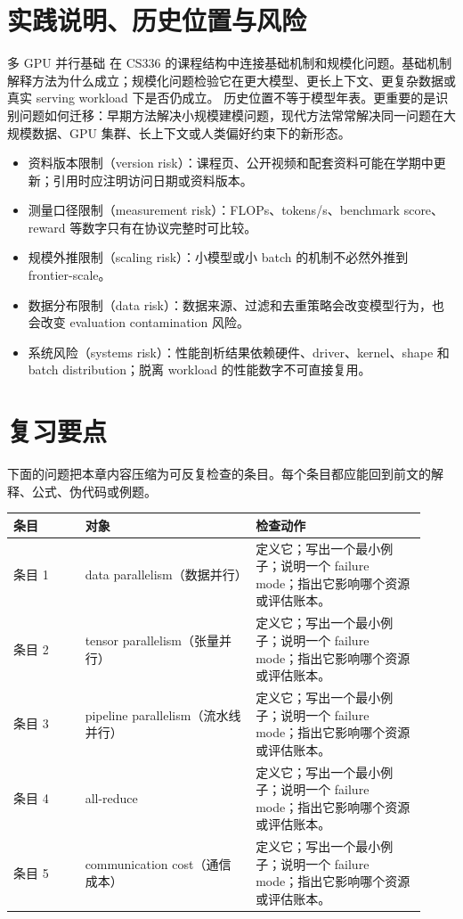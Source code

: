 \documentclass[a4paper]{article}
\begin{document}
\section{实践说明、历史位置与风险}
多 GPU 并行基础 在 CS336 的课程结构中连接基础机制和规模化问题。基础机制解释方法为什么成立；规模化问题检验它在更大模型、更长上下文、更复杂数据或真实 serving workload 下是否仍成立。
历史位置不等于模型年表。更重要的是识别问题如何迁移：早期方法解决小规模建模问题，现代方法常常解决同一问题在大规模数据、GPU 集群、长上下文或人类偏好约束下的新形态。
\begin{itemize}
\item 资料版本限制（version risk）：课程页、公开视频和配套资料可能在学期中更新；引用时应注明访问日期或资料版本。
\item 测量口径限制（measurement risk）：FLOPs、tokens/s、benchmark score、reward 等数字只有在协议完整时可比较。
\item 规模外推限制（scaling risk）：小模型或小 batch 的机制不必然外推到 frontier-scale。
\item 数据分布限制（data risk）：数据来源、过滤和去重策略会改变模型行为，也会改变 evaluation contamination 风险。
\item 系统风险（systems risk）：性能剖析结果依赖硬件、driver、kernel、shape 和 batch distribution；脱离 workload 的性能数字不可直接复用。
\end{itemize}
\section{复习要点}
下面的问题把本章内容压缩为可反复检查的条目。每个条目都应能回到前文的解释、公式、伪代码或例题。
\begin{longtable}{p{0.16\linewidth}p{0.38\linewidth}p{0.38\linewidth}}
\toprule
\textbf{条目} & \textbf{对象} & \textbf{检查动作}\\
\midrule
条目 1 & data parallelism（数据并行） & 定义它；写出一个最小例子；说明一个 failure mode；指出它影响哪个资源或评估账本。\\
条目 2 & tensor parallelism（张量并行） & 定义它；写出一个最小例子；说明一个 failure mode；指出它影响哪个资源或评估账本。\\
条目 3 & pipeline parallelism（流水线并行） & 定义它；写出一个最小例子；说明一个 failure mode；指出它影响哪个资源或评估账本。\\
条目 4 & all-reduce & 定义它；写出一个最小例子；说明一个 failure mode；指出它影响哪个资源或评估账本。\\
条目 5 & communication cost（通信成本） & 定义它；写出一个最小例子；说明一个 failure mode；指出它影响哪个资源或评估账本。\\
\bottomrule
\end{longtable}
\end{document}
